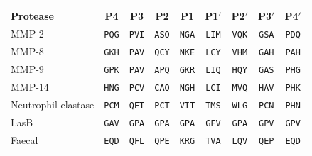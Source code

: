 \begin{tabular}{@{}lcccccccc@{}}\toprule
Protease & P4 & P3 & P2 & P1 & P1$'$ & P2$'$ & P3$'$ & P4$'$ \\\midrule
MMP-2 & \texttt{PQG} & \texttt{PVI} & \texttt{ASQ} & \texttt{NGA} & \texttt{LIM} & \texttt{VQK} & \texttt{GSA} & \texttt{PDQ} \\
MMP-8 & \texttt{GKH} & \texttt{PAV} & \texttt{QCY} & \texttt{NKE} & \texttt{LCY} & \texttt{VHM} & \texttt{GAH} & \texttt{PAH} \\
MMP-9 & \texttt{GPK} & \texttt{PAV} & \texttt{APQ} & \texttt{GKR} & \texttt{LIQ} & \texttt{HQY} & \texttt{GAS} & \texttt{PHG} \\
MMP-14 & \texttt{HNG} & \texttt{PCV} & \texttt{CAQ} & \texttt{NGH} & \texttt{LCI} & \texttt{MVQ} & \texttt{HAV} & \texttt{PHK} \\
Neutrophil elastase & \texttt{PCM} & \texttt{QET} & \texttt{PCT} & \texttt{VIT} & \texttt{TMS} & \texttt{WLG} & \texttt{PCN} & \texttt{PHN} \\
LasB & \texttt{GAV} & \texttt{GPA} & \texttt{GPA} & \texttt{GPA} & \texttt{GFV} & \texttt{GPA} & \texttt{GPV} & \texttt{GPV} \\
Faecal & \texttt{EQD} & \texttt{QFL} & \texttt{QPE} & \texttt{KRG} & \texttt{TVA} & \texttt{LQV} & \texttt{QEP} & \texttt{EQD} \\
\bottomrule\end{tabular}
